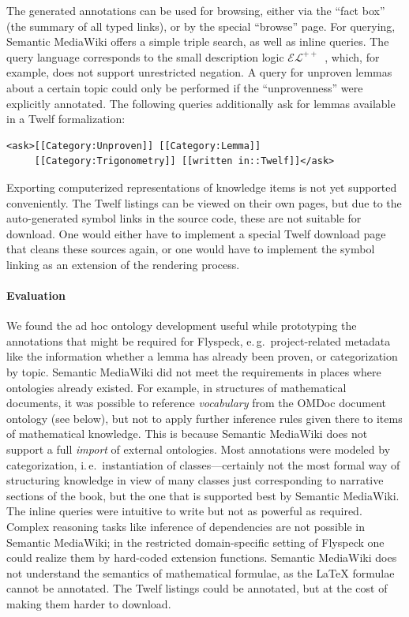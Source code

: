 \begin{contribution}
The generated annotations can be used for browsing, either via the ``fact box''
(the summary of all typed links), or by the special ``browse'' page.  For
querying, Semantic MediaWiki offers a simple triple search, as well as inline
queries.  The query language corresponds to the small description logic
$\mathcal{EL}^{++}$~\cite{KrSchVr:semwiki-reasoning07}, which, for example, does
not support unrestricted negation.  A query for unproven lemmas about a certain
topic could only be performed if the ``unprovenness'' were explicitly annotated.
The following queries additionally ask for lemmas available in a Twelf
formalization:

\begin{lstlisting}
<ask>[[Category:Unproven]] [[Category:Lemma]]
     [[Category:Trigonometry]] [[written in::Twelf]]</ask>
\end{lstlisting}

Exporting computerized representations of knowledge items is not yet supported
conveniently.  The Twelf listings can be viewed on their own pages, but due to
the auto-generated symbol links in the source code, these are not suitable for
download.  One would either have to implement a special Twelf download page that
cleans these sources again, or one would have to implement the symbol linking as
an extension of the rendering process.
\end{contribution}

\begin{evaluation}
\paragraph{Evaluation} We found the ad hoc ontology development useful while
prototyping the annotations that might be required for Flyspeck, e.\,g.\
project-related metadata like the information whether a lemma has already been
proven, or categorization by topic.  Semantic MediaWiki did not meet the
requirements in places where ontologies already existed.  For example, in
structures of mathematical documents, it was possible to reference
\emph{vocabulary} from the OMDoc document ontology (see below), but not to apply
further inference rules given there to items of mathematical knowledge.  This is
because Semantic MediaWiki does not support a full \emph{import} of external
ontologies.  Most annotations were modeled by categorization, i.\,e.\
instantiation of classes---certainly not the most formal way of structuring
knowledge in view of many classes just corresponding to narrative sections of
the book, but the one that is supported best by Semantic MediaWiki.  The inline
queries were intuitive to write but not as powerful as required.  Complex
reasoning tasks like inference of dependencies are not possible in Semantic
MediaWiki; in the restricted domain-specific setting of Flyspeck one could
realize them by hard-coded extension functions.  Semantic MediaWiki does not
understand the semantics of mathematical formulae, as the {\LaTeX} formulae
cannot be annotated.  The Twelf listings could be annotated, but at the cost of
making them harder to download.
\end{evaluation}

